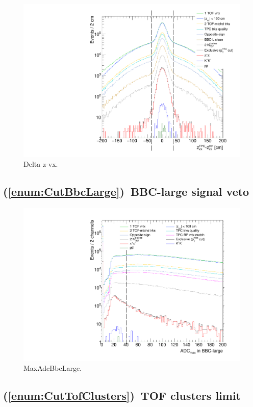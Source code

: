 \begin{figure}[ht!]
\centering%
\includegraphics[width=0.475\linewidth,page=1]{graphics/eventSelection/DeltaZVx.pdf}%
\caption{Delta z-vx.}\label{fig:DeltaZVx}%
\end{figure}

\subsection{(\ref{enum:CutBbcLarge})~BBC-large signal veto}

\begin{figure}[ht!]
\centering%
\includegraphics[width=0.475\linewidth,page=1]{graphics/eventSelection/MaxAdcBbcLarge.pdf}%
\caption{MaxAdcBbcLarge.}\label{fig:MaxAdcBbcLarge}%
\end{figure}


\subsection{(\ref{enum:CutTofClusters})~TOF clusters limit}

